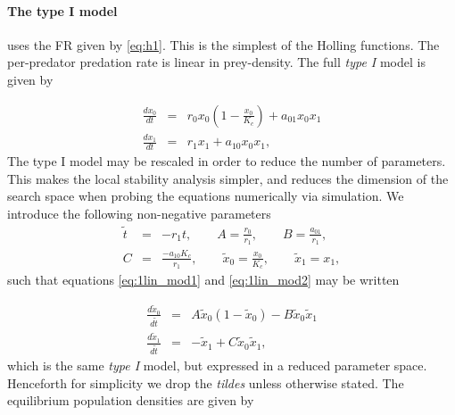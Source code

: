 \paragraph*{The type I model} uses the FR given by \eqref{eq:h1}. This is the simplest of the Holling functions. The per-predator predation rate is linear in prey-density. The full \emph{type I} model is given by

\begin{eqnarray}
\frac{dx_{0}}{dt} &=& r_0x_0\left(1-\frac{x_0}{K_c}\right) + a_{01}x_0x_1 \label{eq:1lin_mod1} \\[10pt]
\frac{dx_{1}}{dt} &=& r_1x_1 + a_{10}x_0x_1 \label{eq:1lin_mod2}, 
\end{eqnarray}
%
The type I model may be rescaled in order to reduce the number of parameters. This makes the local stability analysis simpler, and reduces the dimension of the search space when probing the equations numerically via simulation. We introduce the following non-negative parameters
\begin{eqnarray}
\tilde{t} &=& -r_1 t, \qquad A = \frac{r_0}{r_1}, \qquad B = \frac{a_{01}}{r_1}, \\[10pt]
C &=& \frac{-a_{10}K_c}{r_1}, \qquad \tilde{x}_0 = \frac{x_0}{K_c}, \qquad \tilde{x}_1 = x_1,
\end{eqnarray}
%
such that equations \eqref{eq:1lin_mod1} and \eqref{eq:1lin_mod2} may be written

\begin{eqnarray}
\frac{d\tilde{x}_{0}}{d\tilde{t}} &=& A\tilde{x}_0(1-\tilde{x}_0) - B\tilde{x}_0\tilde{x}_1 \label{eq:lin_mod1} \\[10pt]
\frac{d\tilde{x}_{1}}{d\tilde{t}} &=& -\tilde{x}_1 + C\tilde{x}_0\tilde{x}_1 \label{eq:lin_mod2}, 
\end{eqnarray}
%
which is the same \emph{type I} model, but expressed in a reduced parameter space. Henceforth for simplicity we drop the \emph{tildes} unless otherwise stated. The equilibrium population densities are given by

